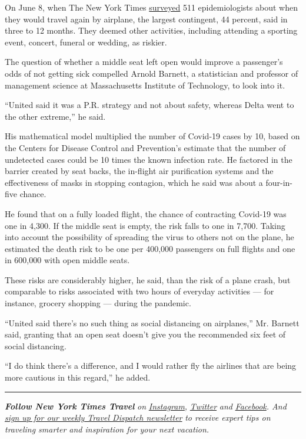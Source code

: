On June 8, when The New York Times
\href{https://www.nytimes3xbfgragh.onion/interactive/2020/06/08/upshot/when-epidemiologists-will-do-everyday-things-coronavirus.html}{surveyed}
511 epidemiologists about when they would travel again by airplane, the
largest contingent, 44 percent, said in three to 12 months. They deemed
other activities, including attending a sporting event, concert, funeral
or wedding, as riskier.

The question of whether a middle seat left open would improve a
passenger's odds of not getting sick compelled Arnold Barnett, a
statistician and professor of management science at Massachusetts
Institute of Technology, to look into it.

``United said it was a P.R. strategy and not about safety, whereas Delta
went to the other extreme,'' he said.

His mathematical model multiplied the number of Covid-19 cases by 10,
based on the Centers for Disease Control and Prevention's estimate that
the number of undetected cases could be 10 times the known infection
rate. He factored in the barrier created by seat backs, the in-flight
air purification systems and the effectiveness of masks in stopping
contagion, which he said was about a four-in-five chance.

He found that on a fully loaded flight, the chance of contracting
Covid-19 was one in 4,300. If the middle seat is empty, the risk falls
to one in 7,700. Taking into account the possibility of spreading the
virus to others not on the plane, he estimated the death risk to be one
per 400,000 passengers on full flights and one in 600,000 with open
middle seats.

These risks are considerably higher, he said, than the risk of a plane
crash, but comparable to risks associated with two hours of everyday
activities --- for instance, grocery shopping --- during the pandemic.

``United said there's no such thing as social distancing on airplanes,''
Mr. Barnett said, granting that an open seat doesn't give you the
recommended six feet of social distancing.

``I do think there's a difference, and I would rather fly the airlines
that are being more cautious in this regard,'' he added.

\begin{center}\rule{0.5\linewidth}{\linethickness}\end{center}

\emph{\textbf{Follow New York Times Travel}} \emph{on}
\href{https://www.instagram.com/nytimestravel/}{\emph{Instagram}}\emph{,}
\href{https://twitter.com/nytimestravel}{\emph{Twitter}} \emph{and}
\href{https://www.facebookcorewwwi.onion/nytimestravel/}{\emph{Facebook}}\emph{.
And}
\href{https://www.nytimes3xbfgragh.onion/newsletters/traveldispatch}{\emph{sign
up for our weekly Travel Dispatch newsletter}} \emph{to receive expert
tips on traveling smarter and inspiration for your next vacation.}

